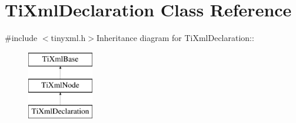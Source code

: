 \hypertarget{class_ti_xml_declaration}{
\section{TiXmlDeclaration Class Reference}
\label{class_ti_xml_declaration}
}


{\ttfamily \#include $<$tinyxml.h$>$}Inheritance diagram for TiXmlDeclaration::\begin{figure}[H]
\begin{center}
\leavevmode
\includegraphics[height=3cm]{class_ti_xml_declaration}
\end{center}
\end{figure}
